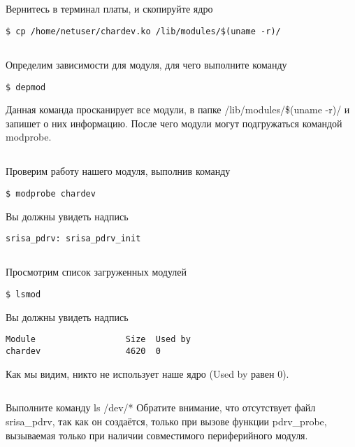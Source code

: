 \subsection{}Вернитесь в терминал платы, и скопируйте ядро
\begin{lstlisting}[style=bash]
$ cp /home/netuser/chardev.ko /lib/modules/$(uname -r)/
\end{lstlisting}

\subsection{}Определим зависимости для модуля, для чего выполните команду 
\begin{lstlisting}[style=bash]
$ depmod
\end{lstlisting}
Данная команда просканирует все модули, в папке /lib/modules/\$(uname -r)/ и запишет о них информацию. После чего модули могут подгружаться командой modprobe. 

\subsection{}Проверим работу нашего модуля, выполнив команду
\begin{lstlisting}[style=bash]
$ modprobe chardev
\end{lstlisting}
Вы должны увидеть надпись 
\begin{lstlisting}[style=stdout]
srisa_pdrv: srisa_pdrv_init
\end{lstlisting}

\subsection{}Просмотрим список загруженных модулей
\begin{lstlisting}[style=bash]
$ lsmod
\end{lstlisting}
Вы должны увидеть надпись 
\begin{lstlisting}[style=stdout]
Module                  Size  Used by
chardev                 4620  0
\end{lstlisting}
Как мы видим, никто не использует наше ядро (Used by равен 0). 

\subsection{}Выполните команду ls /dev/* Обратите внимание, что отсутствует файл srisa\_pdrv, так как он создаётся, только при вызове функции pdrv\_probe, вызываемая только при наличии совместимого периферийного модуля.

